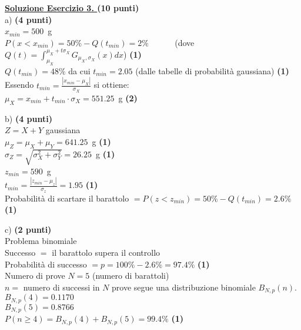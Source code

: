\documentclass[10pt,a4paper,fleqn]{article}
\begin{document}
\vskip0.30cm {\bf \underline {Soluzione Esercizio 3. } } {\bf (10 punti)} \\

a) {\bf (4 punti)} \\
$x_{min}=500$~g\\ 
$P(x<x_{min})=50\% - Q(t_{min})=2\%$ ~~~~~ (dove
$Q(t)=\int_{\mu_X}^{\mu_X+t\sigma_X} G_{\mu_X,\sigma_X} (x) dx$) {\bf (1)}\\
$Q(t_{min})=48\%$ da cui $t_{min}=2.05$ (dalle tabelle di
probabilit\`a gaussiana) {\bf (1)}\\
Essendo $t_{min}=\frac{|x_{min}-\mu_X|}{\sigma_X}$ si ottiene:\\
$\mu_X=x_{min}+t_{min}\cdot\sigma_X=551.25$~g {\bf (2)}

b) {\bf (4 punti)} \\
$Z=X+Y$ gaussiana\\
$\mu_Z=\mu_X+\mu_Y=641.25$~g {\bf (1)} \\
$\sigma_Z=\sqrt{\sigma^2_X+\sigma^2_Y}=26.25$~g {\bf (1)}\\
$z_{min}=590$~g\\
$t_{min}=\frac{|z_{min}-\mu_z|}{\sigma_z}=1.95$ {\bf (1)} \\
Probabilit\`a di scartare il barattolo
$=P(z<z_{min})=50\%-Q(t_{min})=2.6\%$ {\bf (1)}

c) {\bf (2 punti)} \\
Problema binomiale\\
Successo $=$ il barattolo supera il controllo \\
Probabilit\`a di successo $=p=100\%-2.6\%=97.4\%$ {\bf (1)} \\
Numero di prove $N=5$ (numero di barattoli)\\
$n = $ numero di successi in $N$ prove segue una distribuzione
binomiale $B_{N,p}(n)$.\\
$B_{N,p}(4)=0.1170$\\
$B_{N,p}(5)=0.8766$\\
$P(n\ge 4)=B_{N,p}(4)+B_{N,p}(5)=99.4\%$ {\bf (1)}
\end{document}
